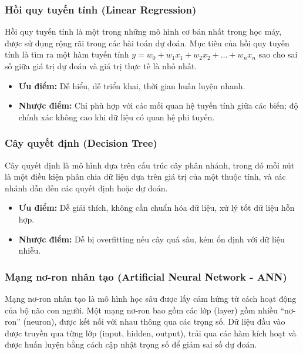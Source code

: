 \subsubsection{ Hồi quy tuyến tính (Linear Regression)}

Hồi quy tuyến tính là một trong những mô hình cơ bản nhất trong học máy, được sử dụng rộng rãi trong các bài toán dự đoán. Mục tiêu của hồi quy tuyến tính là tìm ra một hàm tuyến tính \( y = w_0 + w_1x_1 + w_2x_2 + \ldots + w_nx_n \) sao cho sai số giữa giá trị dự đoán và giá trị thực tế là nhỏ nhất.

\begin{itemize}
    \item \textbf{Ưu điểm:} Dễ hiểu, dễ triển khai, thời gian huấn luyện nhanh.
    \item \textbf{Nhược điểm:} Chỉ phù hợp với các mối quan hệ tuyến tính giữa các biến; độ chính xác không cao khi dữ liệu có quan hệ phi tuyến.
\end{itemize}

\subsubsection{ Cây quyết định (Decision Tree)}

Cây quyết định là mô hình dựa trên cấu trúc cây phân nhánh, trong đó mỗi nút là một điều kiện phân chia dữ liệu dựa trên giá trị của một thuộc tính, và các nhánh dẫn đến các quyết định hoặc dự đoán.

\begin{itemize}
    \item \textbf{Ưu điểm:} Dễ giải thích, không cần chuẩn hóa dữ liệu, xử lý tốt dữ liệu hỗn hợp.
    \item \textbf{Nhược điểm:} Dễ bị overfitting nếu cây quá sâu, kém ổn định với dữ liệu nhiễu.
\end{itemize}


\subsubsection{ Mạng nơ-ron nhân tạo (Artificial Neural Network - ANN)}

Mạng nơ-ron nhân tạo là mô hình học sâu được lấy cảm hứng từ cách hoạt động của bộ não con người. Một mạng nơ-ron bao gồm các lớp (layer) gồm nhiều “nơ-ron” (neuron), được kết nối với nhau thông qua các trọng số. Dữ liệu đầu vào được truyền qua từng lớp (input, hidden, output), trải qua các hàm kích hoạt và được huấn luyện bằng cách cập nhật trọng số để giảm sai số dự đoán.


